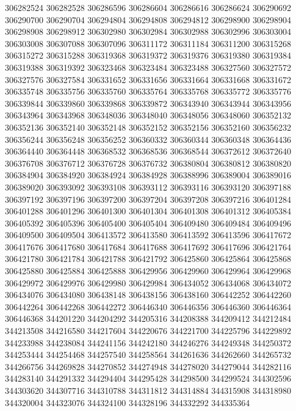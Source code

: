 { 306282524
 306282528
 306286596
 306286604
 306286616
 306286624
 306290692
 306290700
 306290704
 306294804
 306294808
 306294812
 306298900
 306298904
 306298908
 306298912
 306302980
 306302984
 306302988
 306302996
 306303004
 306303008
 306307088
 306307096
 306311172
 306311184
 306311200
 306315268
 306315272
 306315288
 306319368
 306319372
 306319376
 306319380
 306319384
 306319388
 306319392
 306323468
 306323484
 306323488
 306327560
 306327572
 306327576
 306327584
 306331652
 306331656
 306331664
 306331668
 306331672
 306335748
 306335756
 306335760
 306335764
 306335768
 306335772
 306335776
 306339844
 306339860
 306339868
 306339872
 306343940
 306343944
 306343956
 306343964
 306343968
 306348036
 306348040
 306348056
 306348060
 306352132
 306352136
 306352140
 306352148
 306352152
 306352156
 306352160
 306356232
 306356244
 306356248
 306356252
 306360332
 306360344
 306360348
 306364436
 306364440
 306364448
 306368532
 306368536
 306368544
 306372612
 306372640
 306376708
 306376712
 306376728
 306376732
 306380804
 306380812
 306380820
 306384904
 306384920
 306384924
 306384928
 306388996
 306389004
 306389016
 306389020
 306393092
 306393108
 306393112
 306393116
 306393120
 306397188
 306397192
 306397196
 306397200
 306397204
 306397208
 306397216
 306401284
 306401288
 306401296
 306401300
 306401304
 306401308
 306401312
 306405384
 306405392
 306405396
 306405400
 306405404
 306409480
 306409484
 306409496
 306409500
 306409504
 306413572
 306413580
 306413592
 306413596
 306417672
 306417676
 306417680
 306417684
 306417688
 306417692
 306417696
 306421764
 306421780
 306421784
 306421788
 306421792
 306425860
 306425864
 306425868
 306425880
 306425884
 306425888
 306429956
 306429960
 306429964
 306429968
 306429972
 306429976
 306429980
 306429984
 306434052
 306434068
 306434072
 306434076
 306434080
 306438148
 306438156
 306438160
 306442252
 306442260
 306442264
 306442268
 306442272
 306446340
 306446356
 306446360
 306446364
 306446368
 344201220
 344204292
 344205316
 344208388
 344209412
 344212484
 344213508
 344216580
 344217604
 344220676
 344221700
 344225796
 344229892
 344233988
 344238084
 344241156
 344242180
 344246276
 344249348
 344250372
 344253444
 344254468
 344257540
 344258564
 344261636
 344262660
 344265732
 344266756
 344269828
 344270852
 344274948
 344278020
 344279044
 344282116
 344283140
 344291332
 344294404
 344295428
 344298500
 344299524
 344302596
 344303620
 344307716
 344310788
 344311812
 344314884
 344315908
 344318980
 344320004
 344323076
 344324100
 344328196
 344332292
 344335364
}
